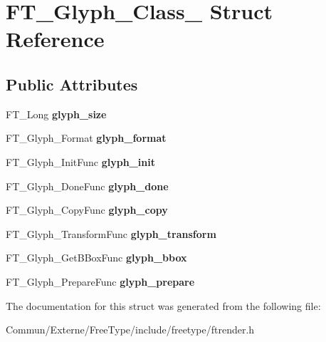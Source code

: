 \hypertarget{struct_f_t___glyph___class__}{}\section{F\+T\+\_\+\+Glyph\+\_\+\+Class\+\_\+ Struct Reference}
\label{struct_f_t___glyph___class__}
\subsection*{Public Attributes}
\begin{DoxyCompactItemize}
\item 
F\+T\+\_\+\+Long {\bfseries glyph\+\_\+size}\hypertarget{struct_f_t___glyph___class___a1a76c68b9fb0e93947e888c0fe77cbf8}{}\label{struct_f_t___glyph___class___a1a76c68b9fb0e93947e888c0fe77cbf8}

\item 
F\+T\+\_\+\+Glyph\+\_\+\+Format {\bfseries glyph\+\_\+format}\hypertarget{struct_f_t___glyph___class___a26738bd14d5845e18d09ccaa3a709d23}{}\label{struct_f_t___glyph___class___a26738bd14d5845e18d09ccaa3a709d23}

\item 
F\+T\+\_\+\+Glyph\+\_\+\+Init\+Func {\bfseries glyph\+\_\+init}\hypertarget{struct_f_t___glyph___class___a657200ad15ff061b38fb25b168737f95}{}\label{struct_f_t___glyph___class___a657200ad15ff061b38fb25b168737f95}

\item 
F\+T\+\_\+\+Glyph\+\_\+\+Done\+Func {\bfseries glyph\+\_\+done}\hypertarget{struct_f_t___glyph___class___aabf05a4368dccacf45e1a54e542e5d63}{}\label{struct_f_t___glyph___class___aabf05a4368dccacf45e1a54e542e5d63}

\item 
F\+T\+\_\+\+Glyph\+\_\+\+Copy\+Func {\bfseries glyph\+\_\+copy}\hypertarget{struct_f_t___glyph___class___afc78dcdc4802760ebcaccf3a7b6cd088}{}\label{struct_f_t___glyph___class___afc78dcdc4802760ebcaccf3a7b6cd088}

\item 
F\+T\+\_\+\+Glyph\+\_\+\+Transform\+Func {\bfseries glyph\+\_\+transform}\hypertarget{struct_f_t___glyph___class___a5f72ac1d0d92eb31fa3e2bb721a97ef2}{}\label{struct_f_t___glyph___class___a5f72ac1d0d92eb31fa3e2bb721a97ef2}

\item 
F\+T\+\_\+\+Glyph\+\_\+\+Get\+B\+Box\+Func {\bfseries glyph\+\_\+bbox}\hypertarget{struct_f_t___glyph___class___a06bfad431865c6731305cb781f78b317}{}\label{struct_f_t___glyph___class___a06bfad431865c6731305cb781f78b317}

\item 
F\+T\+\_\+\+Glyph\+\_\+\+Prepare\+Func {\bfseries glyph\+\_\+prepare}\hypertarget{struct_f_t___glyph___class___af7f406e5ea20a6614c946746938830c9}{}\label{struct_f_t___glyph___class___af7f406e5ea20a6614c946746938830c9}

\end{DoxyCompactItemize}


The documentation for this struct was generated from the following file\+:\begin{DoxyCompactItemize}
\item 
Commun/\+Externe/\+Free\+Type/include/freetype/ftrender.\+h\end{DoxyCompactItemize}
